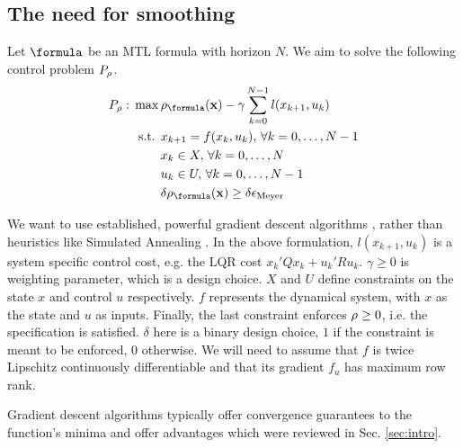 \subsection{The need for smoothing}
\label{sec:need for smoothing}
Let $\formula$ be an MTL formula with horizon $N$.
We aim to solve the following control problem $P_\rho$.
\begin{subequations}
\label{eq:general_ctrl}
\begin{align}
P_\rob:\, \max\, & \rob_{\formula}(\sstraj) - \gamma \sum_{k=0}^{N-1} l(x_{k+1},u_{k}) \label{eq:general ctrl obj}\\
\text{s.t. } & x_{k+1} = f(x_k,u_k), \, \forall k=0,\dotsc,N-1 \label{eq:general ctrl dyn}\\
 & x_k \in X, \, \forall k=0,\dotsc,N \label{eq:general ctrl X}\\
 & u_k \in U, \, \forall k=0,\dotsc,N-1 \label{eq:general ctrl U}\\
 & \delta \rob_{\formula}(\sstraj) \geq \delta \epsilon_{\text{Meyer}} \label{eq:general ctrl pos rob}
\end{align}
\end{subequations}

We want to use established, powerful gradient descent algorithms \cite{Polak97_Optim}, rather than heuristics like Simulated Annealing \cite{kirkpatrickV_SA83}. 
In the above formulation, $l(x_{k+1},u_{k})$ is a system specific control cost, e.g. the LQR cost $x_k'Qx_k + u_k'Ru_k$. $\gamma \geq 0$ is weighting parameter, which is a design choice. $X$ and $U$ define constraints on the state $x$ and control $u$ respectively. $f$ represents the dynamical system, with $x$ as the state and $u$ as inputs. Finally, the last constraint enforces $\rho \geq 0$, i.e. the specification is satisfied. 
$\delta$ here is a binary design choice, $1$ if the constraint is meant to be enforced, $0$ otherwise.
We will need to assume that $f$ is twice Lipschitz continuously differentiable and that its gradient $f_u$ has maximum row rank.


Gradient descent algorithms typically offer convergence guarantees to the function's minima and offer advantages which were reviewed in Sec. \ref{sec:intro}.

